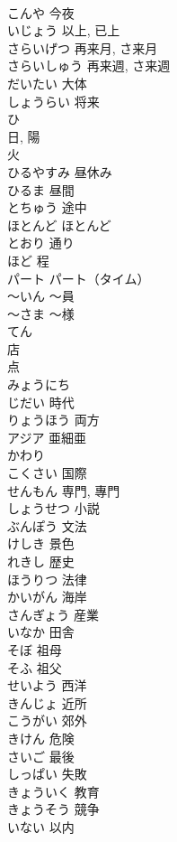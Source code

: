 \documentclass[8pt]{extreport}
\begin{document}
\begin{CJK}{UTF8}{min}
\\	こんや	今夜
\\	いじょう	以上, 已上
\\	さらいげつ	再来月, さ来月
\\	さらいしゅう	再来週, さ来週
\\	だいたい	大体
\\	しょうらい	将来
\\	ひ	
\\	日, 陽 
\\	火
\\	ひるやすみ	昼休み
\\	ひるま	昼間
\\	とちゅう	途中
\\	ほとんど	ほとんど
\\	とおり	通り
\\	ほど	程
\\	パート	パート（タイム）
\\	～いん	～員
\\	～さま	～様
\\	てん	
\\	店 
\\	点
\\	みょうにち	
\\	じだい	時代
\\	りょうほう	両方
\\	アジア	亜細亜
\\	かわり	
\\	こくさい	国際
\\	せんもん	専門, 專門
\\	しょうせつ	小説
\\	ぶんぽう	文法
\\	けしき	景色
\\	れきし	歴史
\\	ほうりつ	法律
\\	かいがん	海岸
\\	さんぎょう	産業
\\	いなか	田舎
\\	そぼ	祖母
\\	そふ	祖父
\\	せいよう	西洋
\\	きんじょ	近所
\\	こうがい	郊外
\\	きけん	危険
\\	さいご	最後
\\	しっぱい	失敗
\\	きょういく	教育
\\	きょうそう	競争
\\	いない	以内

\end{CJK}
\end{document}
